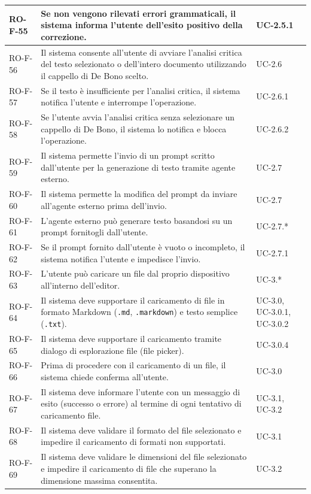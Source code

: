 \documentclass[11pt,a4paper]{article}
\begin{document}
\begin{longtable}{|p{}|>{\raggedright\arraybackslash}p{}|p{}|}
\hline
RO-F-55 & Se non vengono rilevati errori grammaticali, il sistema informa l'utente dell'esito positivo della correzione. & UC-2.5.1 \\
\hline
RO-F-56 & Il sistema consente all'utente di avviare l'analisi critica del testo selezionato o dell'intero documento utilizzando il cappello di De Bono scelto. & UC-2.6 \\
\hline
RO-F-57 & Se il testo è insufficiente per l'analisi critica, il sistema notifica l'utente e interrompe l'operazione. & UC-2.6.1 \\
\hline
RO-F-58 & Se l'utente avvia l'analisi critica senza selezionare un cappello di De Bono, il sistema lo notifica e blocca l'operazione. & UC-2.6.2 \\
\hline
RO-F-59 & Il sistema permette l'invio di un prompt scritto dall'utente per la generazione di testo tramite agente esterno. & UC-2.7 \\
\hline
RO-F-60 & Il sistema permette la modifica del prompt da inviare all'agente esterno prima dell'invio. & UC-2.7 \\
\hline
RO-F-61 & L'agente esterno può generare testo basandosi su un prompt fornitogli dall'utente. & UC-2.7.* \\
\hline
RO-F-62 & Se il prompt fornito dall'utente è vuoto o incompleto, il sistema notifica l'utente e impedisce l'invio. & UC-2.7.1 \\
\hline
RO-F-63 & L'utente può caricare un file dal proprio dispositivo all'interno dell'editor. & UC-3.* \\
\hline
RO-F-64 & Il sistema deve supportare il caricamento di file in formato Markdown (\texttt{.md}, \texttt{.markdown}) e testo semplice (\texttt{.txt}). & UC-3.0, UC-3.0.1, UC-3.0.2 \\
\hline
RO-F-65 & Il sistema deve supportare il caricamento tramite dialogo di esplorazione file (file picker). & UC-3.0.4 \\
\hline
RO-F-66 & Prima di procedere con il caricamento di un file, il sistema chiede conferma all'utente. & UC-3.0 \\
\hline
RO-F-67 & Il sistema deve informare l'utente con un messaggio di esito (successo o errore) al termine di ogni tentativo di caricamento file. & UC-3.1, UC-3.2 \\
\hline
RO-F-68 & Il sistema deve validare il formato del file selezionato e impedire il caricamento di formati non supportati. & UC-3.1 \\
\hline
RO-F-69 & Il sistema deve validare le dimensioni del file selezionato e impedire il caricamento di file che superano la dimensione massima consentita. & UC-3.2 \\

\end{longtable}
\end{document}
